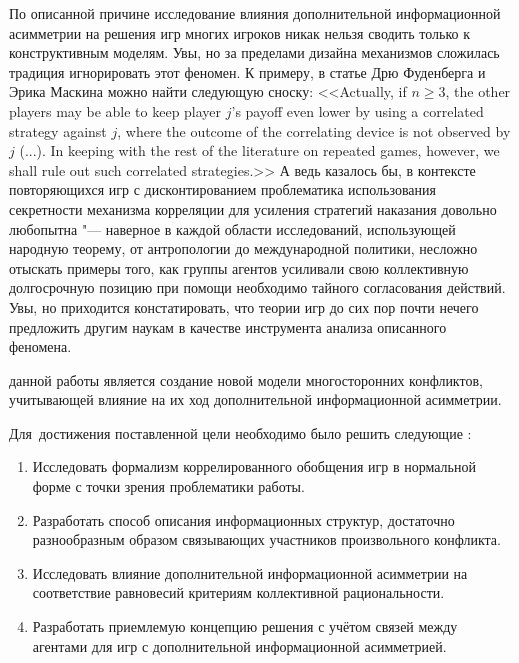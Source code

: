 По описанной причине исследование влияния дополнительной информационной асимметрии на решения игр многих игроков никак нельзя сводить только к конструктивным моделям. Увы, но за пределами дизайна механизмов сложилась традиция игнорировать этот феномен. К примеру, в статье \ifsynopsis\smartcite{Fudenberg}\else\cite{Fudenberg}\fi Дрю Фуденберга и Эрика Маскина можно найти следующую сноску: <<Actually, if $n \ge 3$, the other players may be able to keep player $j$'s payoff even lower by using a correlated strategy against $j$, where the outcome of the correlating device is not observed by $j$ (...). In keeping with the rest of the literature on repeated games, however, we shall rule out such correlated strategies.>> \ifsynopsis\else А ведь казалось бы, в контексте повторяющихся игр с дисконтированием проблематика использования секретности механизма корреляции для усиления стратегий наказания довольно любопытна "--- наверное в каждой области исследований, использующей народную теорему, от антропологии до международной политики, несложно отыскать примеры того, как группы агентов усиливали свою коллективную долгосрочную позицию при помощи необходимо тайного согласования действий. Увы, но приходится констатировать, что теории игр до сих пор почти нечего предложить другим наукам в качестве инструмента анализа описанного феномена. \fi


{\aim} данной работы является создание новой модели многосторонних конфликтов, учитывающей влияние на их ход дополнительной информационной асимметрии.

Для~достижения поставленной цели необходимо было решить следующие {\tasks}:
\begin{enumerate}[beginpenalty=10000] %
  \item Исследовать формализм коррелированного обобщения игр в нормальной форме с точки зрения проблематики работы.
  \item Разработать способ описания информационных структур, достаточно разнообразным образом связывающих участников произвольного конфликта.
  \item Исследовать влияние дополнительной информационной асимметрии на соответствие равновесий критериям коллективной рациональности.
  \item Разработать приемлемую концепцию решения с учётом связей между агентами для игр с дополнительной информационной асимметрией.
\end{enumerate}


